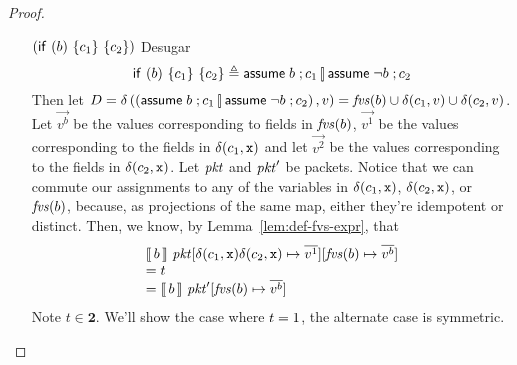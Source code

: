 \begin{proof}
\begin{enumerate}[align=left]
  \item[$(\mathsf{if}~(b)~\{c_1\}~\{c_2\})$] Desugar
    \[\mathsf{if}~(b)~\{c_1\}~\{c_2\} \triangleq\mathsf{assume}\; b\;; c_1 \operatorname*{\left[\!\right]} \mathsf{assume}\; \neg
        b\;; c_2\] Then let
    $D = \delta\left(\left(\mathsf{assume}\; b\;; c_1 \operatorname*{\left[\!\right]} \mathsf{assume}\; \neg b\;;
        c_2\right),v\right) = \mathit{fvs}(b) \cup \delta(c_1,v) \cup
    \delta(c_2,v)$. Let $\vec{v^b}$ be the values corresponding to
    fields in $\mathit{fvs}(b)$, $\vec{v^1}$ be the values corresponding to
    the fields in $\delta(c_1,\texttt{x})$ and let $\vec{v^2}$ be the
    values corresponding to the fields in
    $\delta(c_2,\texttt{x})$. Let $\mathit{pkt}$ and $\mathit{pkt}'$ be
    packets. Notice that we can commute our assignments to any of the
    variables in $\delta(c_1,\texttt{x})$, $\delta(c_2,\texttt{x})$,
    or $\mathit{fvs}(b)$, because, as projections of the same map, either
    they're idempotent or distinct. Then, we know, by
    Lemma~\ref{lem:def-fvs-expr}, that
    \[\begin{array}l
        \bracbb{b}~\pkt[\delta(c_1,\var{x})\delta(c_2,\var{x})
        \mapsto \vec{v^1}][\fvs(b) \mapsto \vec{v^b}] \\
        = t\\
        =  \bracbb{b}~\pkt'[\fvs(b) \mapsto \vec{v^b}]
      \end{array}\]
    Note $t \in \mathbf 2$. We'll show the case where $t = 1$, the
    alternate case is symmetric.


\end{enumerate}
\end{proof}
